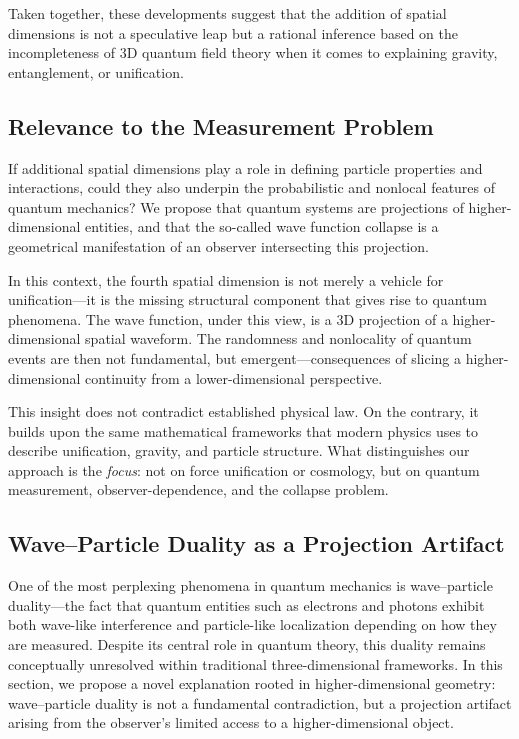 \documentclass[12pt]{article}
\begin{document}
Taken together, these developments suggest that the addition of spatial dimensions is not a speculative leap but a rational inference based on the incompleteness of 3D quantum field theory when it comes to explaining gravity, entanglement, or unification.

\subsection{Relevance to the Measurement Problem}

If additional spatial dimensions play a role in defining particle properties and interactions, could they also underpin the probabilistic and nonlocal features of quantum mechanics? We propose that quantum systems are projections of higher-dimensional entities, and that the so-called wave function collapse is a geometrical manifestation of an observer intersecting this projection.

In this context, the fourth spatial dimension is not merely a vehicle for unification—it is the missing structural component that gives rise to quantum phenomena. The wave function, under this view, is a 3D projection of a higher-dimensional spatial waveform. The randomness and nonlocality of quantum events are then not fundamental, but emergent—consequences of slicing a higher-dimensional continuity from a lower-dimensional perspective.

This insight does not contradict established physical law. On the contrary, it builds upon the same mathematical frameworks that modern physics uses to describe unification, gravity, and particle structure. What distinguishes our approach is the \textit{focus}: not on force unification or cosmology, but on quantum measurement, observer-dependence, and the collapse problem.


\subsection{Wave–Particle Duality as a Projection Artifact}

One of the most perplexing phenomena in quantum mechanics is wave–particle duality—the fact that quantum entities such as electrons and photons exhibit both wave-like interference and particle-like localization depending on how they are measured. Despite its central role in quantum theory, this duality remains conceptually unresolved within traditional three-dimensional frameworks. In this section, we propose a novel explanation rooted in higher-dimensional geometry: wave–particle duality is not a fundamental contradiction, but a projection artifact arising from the observer's limited access to a higher-dimensional object.
\end{document}
